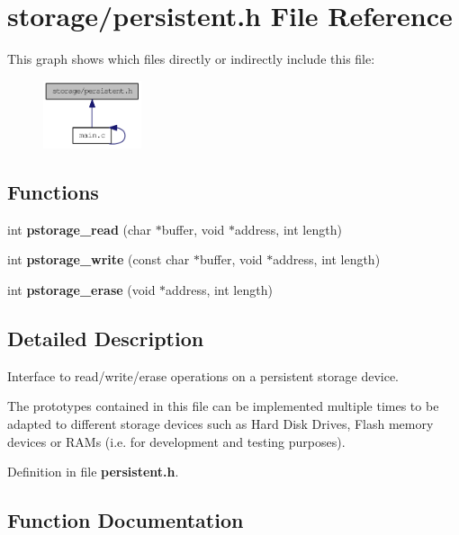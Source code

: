 \section{storage/persistent.h File Reference}
\label{de/de8/persistent_8h}
This graph shows which files directly or indirectly include this file:\nopagebreak
\begin{figure}[H]
\begin{center}
\leavevmode
\includegraphics[width=82pt]{d2/d22/persistent_8h__dep__incl}
\end{center}
\end{figure}
\subsection*{Functions}
\begin{DoxyCompactItemize}
\item 
int {\bf pstorage\_\-read} (char $\ast$buffer, void $\ast$address, int length)
\item 
int {\bf pstorage\_\-write} (const char $\ast$buffer, void $\ast$address, int length)
\item 
int {\bf pstorage\_\-erase} (void $\ast$address, int length)
\end{DoxyCompactItemize}


\subsection{Detailed Description}
Interface to read/write/erase operations on a persistent storage device.

The prototypes contained in this file can be implemented multiple times to be adapted to different storage devices such as Hard Disk Drives, Flash memory devices or RAMs (i.e. for development and testing purposes). 

Definition in file {\bf persistent.h}.



\subsection{Function Documentation}
